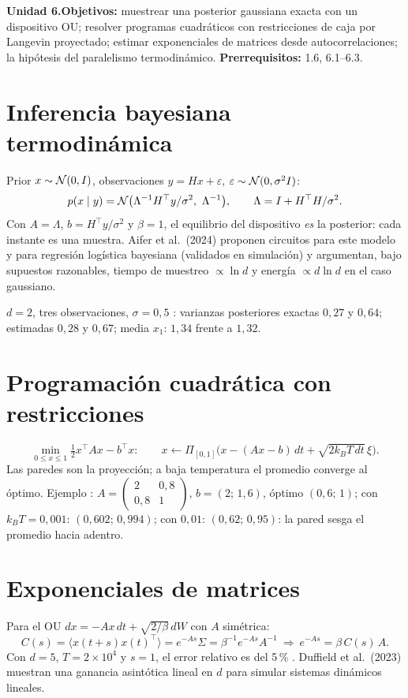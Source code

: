 \documentclass[11pt,a4paper]{article}
\begin{document}

\noindent\textbf{Unidad 6.}\quad\textbf{Objetivos:} muestrear una posterior gaussiana exacta con un dispositivo OU; resolver programas cuadráticos con
restricciones de caja por Langevin proyectado; estimar exponenciales de matrices desde autocorrelaciones; la hipótesis del paralelismo termodinámico.
\textbf{Prerrequisitos:} 1.6, 6.1--6.3.

\section{Inferencia bayesiana termodinámica}
Prior $x\sim\mathcal{N}(0,I)$, observaciones $y=Hx+\varepsilon$, $\varepsilon\sim\mathcal{N}(0,\sigma^2I)$:
\[p(x\mid y)=\N\big(\Lambda^{-1}H^\top y/\sigma^2,\ \Lambda^{-1}\big),\qquad\Lambda=I+H^\top H/\sigma^2.\]
Con $A=\Lambda$, $b=H^\top y/\sigma^2$ y $\beta=1$, el equilibrio del dispositivo \emph{es} la posterior: cada instante es una muestra. Aifer et al.\ (2024)
proponen circuitos para este modelo y para regresión logística bayesiana (validados en simulación) y argumentan, bajo supuestos razonables, tiempo de muestreo
$\propto\ln d$ y energía $\propto d\ln d$ en el caso gaussiano.

\begin{ejemplo}
$d=2$, tres observaciones, $\sigma=0{,}5$ \evS: varianzas posteriores exactas $0{,}27$ y $0{,}64$; estimadas $0{,}28$ y $0{,}67$; media $x_1$: $1{,}34$ frente a $1{,}32$.
\end{ejemplo}

\section{Programación cuadrática con restricciones}
\[\min_{0\le x\le1}\tfrac12x^\top Ax-b^\top x:\qquad x\leftarrow\Pi_{[0,1]}\big(x-(Ax-b)\,dt+\sqrt{2k_BT\,dt}\,\xi\big).\]
Las paredes son la proyección; a baja temperatura el promedio converge al óptimo. Ejemplo \evS: $A=\begin{pmatrix}2&0{,}8\\0{,}8&1\end{pmatrix}$, $b=(2;\,1{,}6)$,
óptimo $(0{,}6;\,1)$; con $k_BT=0{,}001$: $(0{,}602;\,0{,}994)$; con $0{,}01$: $(0{,}62;\,0{,}95)$: la pared sesga el promedio hacia adentro.

\section{Exponenciales de matrices}
Para el OU $dx=-Ax\,dt+\sqrt{2/\beta}\,dW$ con $A$ simétrica:
\[C(s)=\langle x(t+s)x(t)^\top\rangle=e^{-As}\Sigma=\beta^{-1}e^{-As}A^{-1}\ \Rightarrow\ e^{-As}=\beta\,C(s)\,A.\]
Con $d=5$, $T=2\times10^4$ y $s=1$, el error relativo es del 5\,\% \evS. Duffield et al.\ (2023) muestran una ganancia asintótica lineal en $d$ para simular
sistemas dinámicos lineales.
\end{document}
